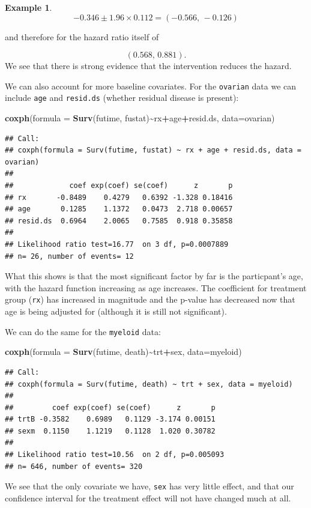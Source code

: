 \documentclass[
  openany]{book}
\newenvironment{Shaded}{\begin{snugshade}}{\end{snugshade}}
\newcommand{\AttributeTok}[1]{\textcolor[rgb]{0.13,0.29,0.53}{#1}}
\newcommand{\FunctionTok}[1]{\textcolor[rgb]{0.13,0.29,0.53}{\textbf{#1}}}
\newcommand{\NormalTok}[1]{#1}
\newcommand{\SpecialCharTok}[1]{\textcolor[rgb]{0.81,0.36,0.00}{\textbf{#1}}}
\theoremstyle{definition}
\theoremstyle{definition}
\newtheorem{example}{Example}[chapter]
\theoremstyle{definition}
\theoremstyle{definition}
\theoremstyle{remark}
\begin{document}
\begin{example}
\[ -0.346 \pm 1.96 \times 0.112 = \left(-0.566,\, -0.126\right) \]

and therefore for the hazard ratio itself of

\[\left(0.568,\, 0.881\right). \]
We see that there is strong evidence that the intervention reduces the hazard.

We can also account for more baseline covariates. For the \texttt{ovarian} data we can include \texttt{age} and \texttt{resid.ds} (whether residual disease is present):

\begin{Shaded}
\begin{Highlighting}[]
\FunctionTok{coxph}\NormalTok{(}\AttributeTok{formula =} \FunctionTok{Surv}\NormalTok{(futime, fustat)}\SpecialCharTok{\textasciitilde{}}\NormalTok{rx}\SpecialCharTok{+}\NormalTok{age}\SpecialCharTok{+}\NormalTok{resid.ds, }\AttributeTok{data=}\NormalTok{ovarian)}
\end{Highlighting}
\end{Shaded}

\begin{verbatim}
## Call:
## coxph(formula = Surv(futime, fustat) ~ rx + age + resid.ds, data = ovarian)
## 
##             coef exp(coef) se(coef)      z       p
## rx       -0.8489    0.4279   0.6392 -1.328 0.18416
## age       0.1285    1.1372   0.0473  2.718 0.00657
## resid.ds  0.6964    2.0065   0.7585  0.918 0.35858
## 
## Likelihood ratio test=16.77  on 3 df, p=0.0007889
## n= 26, number of events= 12
\end{verbatim}

What this shows is that the most significant factor by far is the particpant's age, with the hazard function increasing as age increases. The coefficient for treatment group (\texttt{rx}) has increased in magnitude and the p-value has decreased now that age is being adjusted for (although it is still not significant).

We can do the same for the \texttt{myeloid} data:

\begin{Shaded}
\begin{Highlighting}[]
\FunctionTok{coxph}\NormalTok{(}\AttributeTok{formula =} \FunctionTok{Surv}\NormalTok{(futime, death)}\SpecialCharTok{\textasciitilde{}}\NormalTok{trt}\SpecialCharTok{+}\NormalTok{sex, }\AttributeTok{data=}\NormalTok{myeloid)}
\end{Highlighting}
\end{Shaded}

\begin{verbatim}
## Call:
## coxph(formula = Surv(futime, death) ~ trt + sex, data = myeloid)
## 
##         coef exp(coef) se(coef)      z       p
## trtB -0.3582    0.6989   0.1129 -3.174 0.00151
## sexm  0.1150    1.1219   0.1128  1.020 0.30782
## 
## Likelihood ratio test=10.56  on 2 df, p=0.005093
## n= 646, number of events= 320
\end{verbatim}

We see that the only covariate we have, \texttt{sex} has very little effect, and that our confidence interval for the treatment effect will not have changed much at all.
\end{example}
\end{document}

